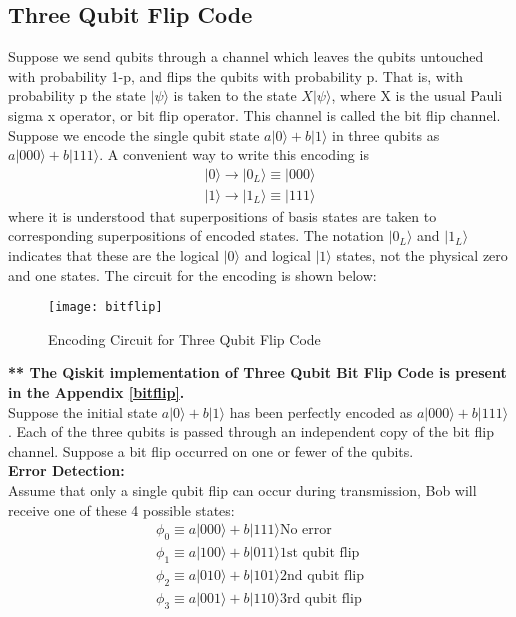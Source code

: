 \documentclass[12pt]{report}
\begin{document}
\subsection{Three Qubit Flip Code}
Suppose we send qubits through a channel which leaves the qubits untouched with probability 1-p, and flips the qubits with probability p. That is, with probability p the state $|\psi\rangle$ is taken to the state $X|\psi\rangle$, where X is the usual Pauli sigma x operator, or bit flip operator. This channel is called the bit flip channel.
Suppose we encode the single qubit state $a|0\rangle+b|1\rangle$ in three qubits as $a|000\rangle+b|111\rangle$. A convenient way to write this encoding is
\begin{equation}
\begin{split}
|0\rangle \to |0_L\rangle \equiv |000\rangle\\
|1\rangle \to |1_L\rangle \equiv |111\rangle
\end{split}
\end{equation}
where it is understood that superpositions of basis states are taken to corresponding superpositions of encoded states. The notation $|0_L\rangle$ and $|1_L\rangle$ indicates that these are the logical $|0\rangle$ and logical $|1\rangle$ states, not the physical zero and one states. The circuit for the encoding is shown below:
\begin{figure}[h]
\centering
\texttt{[image: bitflip]}
\caption{Encoding Circuit for Three Qubit Flip Code}
\label{fig:bitflip}
\end{figure}
\textbf{** The Qiskit implementation of Three Qubit Bit Flip Code is present in the Appendix \ref{bitflip}.}
\\
Suppose the initial state $a|0\rangle + b|1\rangle$ has been perfectly encoded as $a|000\rangle+b|111\rangle$. Each of the three qubits is passed through an independent copy of the bit flip channel. Suppose a bit flip occurred on one or fewer of the qubits.\\
\textbf{Error Detection:}\\
Assume that only a single qubit flip can occur during transmission, Bob will receive one of these 4 possible states:
\begin{equation*}
\begin{split}
	\phi_0 \equiv a|000\rangle+b|111\rangle	\text{No error}\\
	\phi_1 \equiv a|100\rangle+b|011\rangle 	\text{1st qubit flip}\\
	\phi_2 \equiv a|010\rangle+b|101\rangle 	\text{2nd qubit flip}\\
	\phi_3 \equiv a|001\rangle+b|110\rangle	\text{3rd qubit flip}
\end{split}
\end{equation*}
\end{document}
